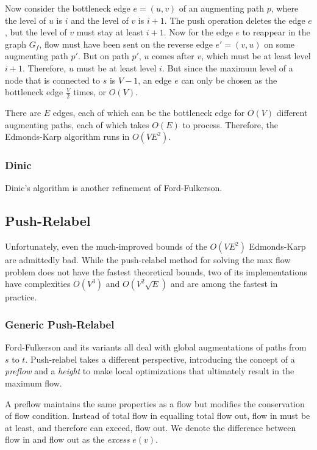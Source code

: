 Now consider the bottleneck edge $e=(u,v)$ of an augmenting path $p$, where the level of $u$ is $i$ and the level of $v$ is $i+1$. The push operation deletes the edge $e$, but the level of $v$ must stay at least $i+1$. Now for the edge $e$ to reappear in the graph $G_f$, flow must have been sent on the reverse edge $e'=(v,u)$ on some augmenting path $p'$. But on path $p'$, $u$ comes after $v$, which must be at least level $i+1$. Therefore, $u$ must be at least level $i$. But since the maximum level of a node that is connected to $s$ is $V-1$, an edge $e$ can only be chosen as the bottleneck edge $\frac{V}{2}$ times, or $O(V)$.

There are $E$ edges, each of which can be the bottleneck edge for $O(V)$ different augmenting paths, each of which takes $O(E)$ to process. Therefore, the Edmonds-Karp algorithm runs in $O(VE^2)$.

\subsubsection{Dinic}

Dinic's algorithm is another refinement of Ford-Fulkerson.

\subsection{Push-Relabel}

Unfortunately, even the much-improved bounds of the $O(VE^2)$ Edmonds-Karp are admittedly bad. While the push-relabel method for solving the max flow problem does not have the fastest theoretical bounds, two of its implementations have complexities $O(V^3)$ and $O(V^2\sqrt{E})$ and are among the fastest in practice.

\subsubsection{Generic Push-Relabel}

Ford-Fulkerson and its variants all deal with global augmentations of paths from $s$ to $t$. Push-relabel takes a different perspective, introducing the concept of a \textit{preflow} and a \textit{height} to make local optimizations that ultimately result in the maximum flow.

A preflow maintains the same properties as a flow but modifies the conservation of flow condition. Instead of total flow in equalling total flow out, flow in must be at least, and therefore can exceed, flow out. We denote the difference between flow in and flow out as the \textit{excess} $e(v)$.

